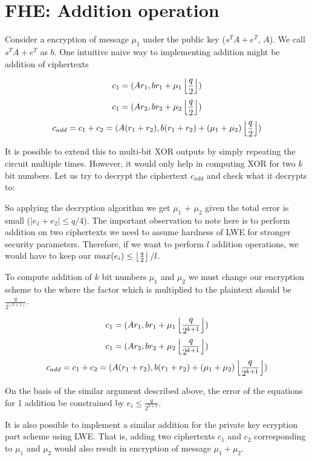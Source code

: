 \documentclass[usletter]{article}
\begin{document}
\section{FHE: Addition operation}

	Consider a encryption of message $\mu_1$ under the public key ($s^{T}A + e^{T}$, $A$). We call 
$s^{T}A + e^{T}$ as $b$. One intuitive naive way to implementing addition might be addition of 
ciphertexts

$$c_1 = ( Ar_1, br_1 + \mu_1\left\lfloor \frac{q}{2} \right\rfloor )$$
$$c_1 = ( Ar_2, br_2 + \mu_2\left\lfloor \frac{q}{2} \right\rfloor )$$
$$c_{add} = c_1 + c_2 = ( A(r_1 + r_2), b(r_1 +r_2) + (\mu_1 + \mu_2)\left\lfloor \frac{q}{2} \right\rfloor )$$

It is possible to extend this to multi-bit XOR outputs by simply repeating 
the circuit multiple times. However, it would only help in computing XOR for two $k$ bit numbers. 
Let us try to decrypt the ciphertext $c_{add}$ and check what it decrypts to:



So applying the decryption algorithm we get $\mu_1$ + $\mu_2$ given the total error
is small ($|e_1 +e_2| \leq q/4$). The important observation to note here is to perform addition on 
two ciphertexts we need to assume hardness of LWE for stronger security parameters. 
Therefore, if we want to perform $l$ addition operations, we would have to keep our $max(e_i) \leq \left\lfloor \frac{q}{2} \right\rfloor/l$.   

\begin{corollary}
To compute addition of $k$ bit numbers $\mu_1$ and $\mu_2$ we must change our 
encryption scheme to the where the factor which is multiplied to the plaintext should be $\frac{q}{2^(k+1)}$. 

$$c_1 = ( Ar_1, br_1 + \mu_1\left\lfloor \frac{q}{2^{k+1}} \right\rfloor )$$
$$c_1 = ( Ar_2, br_2 + \mu_2\left\lfloor \frac{q}{2^{k+1}} \right\rfloor )$$
$$c_{add} = c_1 + c_2 = ( A(r_1 + r_2), b(r_1 +r_2) + (\mu_1 + \mu_2)\left\lfloor \frac{q}{2^{k+1}} \right\rfloor )$$

On the basis of the similar argument described above, the error of the equations for 1 addition be 
constrained by $e_i \leq \frac{q}{2^{k+1}}$.
\end{corollary}
\begin{remark}
It is also possible to implement a similar addition for the private key ecryption part scheme 
using LWE. That is, adding two ciphertexts $c_1$ and $c_2$ corresponding to $\mu_1$ and $\mu_2$
would also result in encryption of message $\mu_1 + \mu_2$.
\end{remark}
\end{document}
